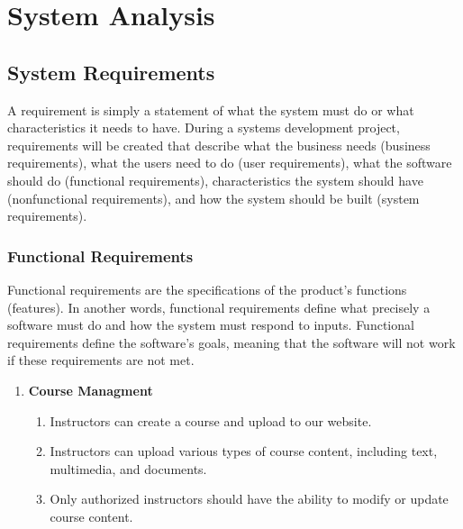 \chapter{System Analysis}

\section{System Requirements}
A requirement is simply a statement of what the system must do or what characteristics
it needs to have. During a systems development project, requirements will be created
that describe what the business needs (business requirements), what the users
need to do (user requirements), what the software should do (functional requirements),
characteristics the system should have (nonfunctional requirements), and how
the system should be built (system requirements).

\subsection{Functional Requirements}
Functional requirements are the specifications of the product’s functions
(features). In another words, functional requirements define what precisely a
software must do and how the system must respond to inputs. Functional
requirements define the software's goals, meaning that the software will not work if
these requirements are not met.

\begin{enumerate}
        \begin{enumerate}[label*=\arabic*.]
            \item The system will allow users to create an account.
            \item The system must validate users credentials to login.
            \item Users should have the ability to reset their passwords in case of forgotten credentials. 
        \end{enumerate}
        \begin{enumerate}[label*=\arabic*.]
            \item Students can enroll courses and see course content
              We will extend this to enroll paid course wit credit card, debit card etc. in the future.
        \end{enumerate}
    \item \textbf{Course Managment} \hfill
        \begin{enumerate}[label*=\arabic*.]
            \item Instructors can create a course and upload to our website.
            \item Instructors can upload various types of course content, including text, multimedia, and documents.
            \item Only authorized instructors should have the ability to modify or update course content.
        \end{enumerate}
\end{enumerate}

